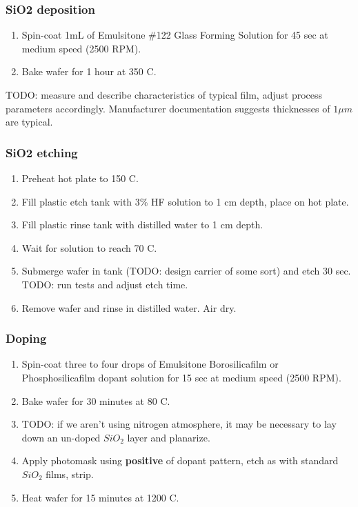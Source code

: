 \subsubsection{SiO2 deposition}
\begin{enumerate}
\item Spin-coat 1mL of Emulsitone \#122 Glass Forming Solution for 45 sec at medium speed (2500 RPM).
\item Bake wafer for 1 hour at 350 C.
\end{enumerate}
TODO: measure and describe characteristics of typical film, adjust process parameters accordingly. Manufacturer documentation
suggests thicknesses of $1 \mu m$ are typical.

\subsubsection{SiO2 etching}
\begin{enumerate}
\item Preheat hot plate to 150 C.
\item Fill plastic etch tank with 3\% HF solution to 1 cm depth, place on hot plate.
\item Fill plastic rinse tank with distilled water to 1 cm depth.
\item Wait for solution to reach 70 C.
\item Submerge wafer in tank (TODO: design carrier of some sort) and etch 30 sec. TODO: run tests and adjust etch time.
\item Remove wafer and rinse in distilled water. Air dry.
\end{enumerate}

\subsubsection{Doping}
\begin{enumerate}
\item Spin-coat three to four drops of Emulsitone Borosilicafilm or Phosphosilicafilm dopant solution for 15 sec at medium
speed (2500 RPM).
\item Bake wafer for 30 minutes at 80 C.
\item TODO: if we aren't using nitrogen atmosphere, it may be necessary to lay down an un-doped $SiO_2$ layer and planarize.
\item Apply photomask using {\bf positive} of dopant pattern, etch as with standard $SiO_2$ films, strip.
\item Heat wafer for 15 minutes at 1200 C.
\end{enumerate}

